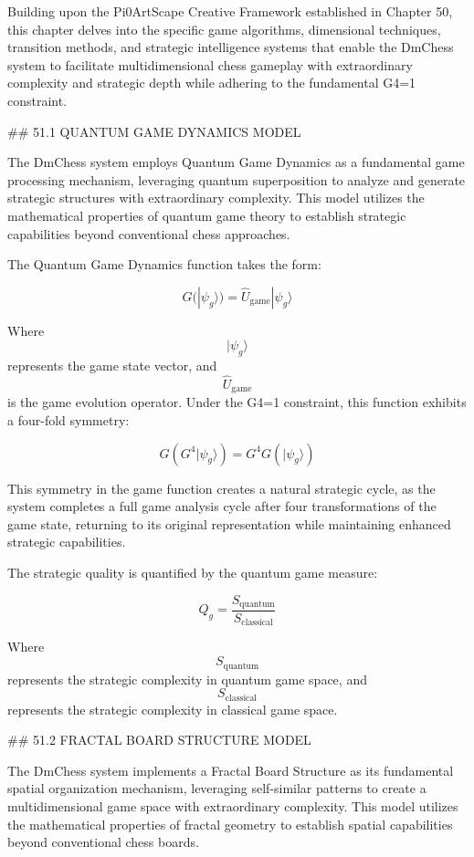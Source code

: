 Building upon the Pi0ArtScape Creative Framework established in Chapter 50, this chapter delves into the specific game algorithms, dimensional techniques, transition methods, and strategic intelligence systems that enable the DmChess system to facilitate multidimensional chess gameplay with extraordinary complexity and strategic depth while adhering to the fundamental G4=1 constraint.

## 51.1 QUANTUM GAME DYNAMICS MODEL

The DmChess system employs Quantum Game Dynamics as a fundamental game processing mechanism, leveraging quantum superposition to analyze and generate strategic structures with extraordinary complexity. This model utilizes the mathematical properties of quantum game theory to establish strategic capabilities beyond conventional chess approaches.

The Quantum Game Dynamics function takes the form:

$$ G(|\psi_g\rangle) = \hat{U}_{\text{game}} |\psi_g\rangle $$

Where $$ |\psi_g\rangle $$ represents the game state vector, and $$ \hat{U}_{\text{game}} $$ is the game evolution operator. Under the G4=1 constraint, this function exhibits a four-fold symmetry:

$$ G(G^4 |\psi_g\rangle) = G^4 G(|\psi_g\rangle) $$

This symmetry in the game function creates a natural strategic cycle, as the system completes a full game analysis cycle after four transformations of the game state, returning to its original representation while maintaining enhanced strategic capabilities.

The strategic quality is quantified by the quantum game measure:

$$ Q_g = \frac{S_{\text{quantum}}}{S_{\text{classical}}} $$

Where $$ S_{\text{quantum}} $$ represents the strategic complexity in quantum game space, and $$ S_{\text{classical}} $$ represents the strategic complexity in classical game space.

## 51.2 FRACTAL BOARD STRUCTURE MODEL

The DmChess system implements a Fractal Board Structure as its fundamental spatial organization mechanism, leveraging self-similar patterns to create a multidimensional game space with extraordinary complexity. This model utilizes the mathematical properties of fractal geometry to establish spatial capabilities beyond conventional chess boards.

